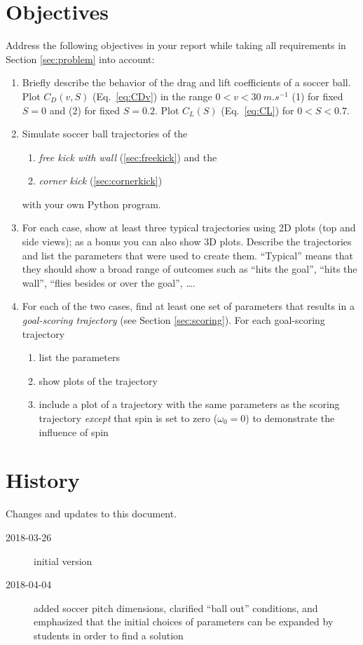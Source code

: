 \documentclass[letterpaper]{scrartcl}
\newenvironment{enuma}{\begin{enumerate}[label=(\alph*)]}{\end{enumerate}}
\newenvironment{enumi}{\begin{enumerate}[label=(\roman*)]}{\end{enumerate}}
\begin{document}
\section{Objectives}
\label{sec:tasks}
Address the following objectives in your report while taking all
requirements in Section \ref{sec:problem} into account:
\begin{enuma}
\item Briefly describe the behavior of the drag and lift coefficients
  of a soccer ball. Plot $C_{D}(v, S)$ (Eq.~\ref{eq:CDv}) in the range
  $0 < v < \SI{30}{m.s^{-1}}$ (1) for fixed $S=0$ and (2) for fixed
  $S=0.2$. Plot $C_{L}(S)$ (Eq.~\ref{eq:CL}) for $0 < S < 0.7$.
\item Simulate soccer ball trajectories of the
  \begin{enumi}
  \item \emph{free kick with wall} (\ref{sec:freekick}) and the
  \item \emph{corner kick} (\ref{sec:cornerkick})    
  \end{enumi}
 with your own Python program. 
\item For each case, show at least three typical trajectories using 2D
  plots (top and side views); as a bonus you can also show 3D
  plots. Describe the trajectories and list the parameters that were
  used to create them. ``Typical'' means that they should show a broad
  range of outcomes such as ``hits the goal'', ``hits the wall'',
  ``flies besides or over the goal'', \dots.
\item For each of the two cases, find at least one set of parameters
  that results in a \emph{goal-scoring trajectory} (see Section
  \ref{sec:scoring}). For each goal-scoring trajectory
  \begin{enumi}    
  \item list the parameters
  \item show plots of the trajectory
  \item include a plot of a trajectory with the same parameters as the
    scoring trajectory \emph{except} that spin is set to zero
    ($\omega_{0} = 0$) to demonstrate the influence of spin
  \end{enumi}
\end{enuma}

\section{History}
\label{sec:history}

Changes and updates to this document.
\begin{description}
\item[2018-03-26] initial version
\item[2018-04-04] added soccer pitch dimensions, clarified ``ball
  out'' conditions, and emphasized that the initial choices of
  parameters can be expanded by students in order to find a solution
\end{description}
  
\end{document}
